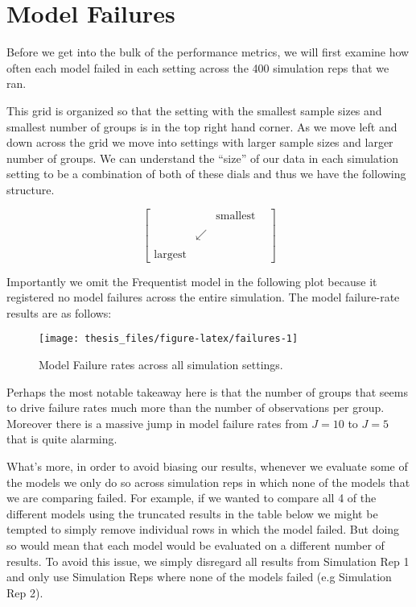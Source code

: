\documentclass[12pt,twoside]{reedthesis}
\begin{document}
\hypertarget{model-failures}{%
\section{Model Failures}\label{model-failures}}

Before we get into the bulk of the performance metrics, we will first examine how often each model failed in each setting across the 400 simulation reps that we ran.

This grid is organized so that the setting with the smallest sample sizes and smallest number of groups is in the top right hand corner. As we move left and down across the grid we move into settings with larger sample sizes and larger number of groups. We can understand the ``size'' of our data in each simulation setting to be a combination of both of these dials and thus we have the following structure.

\[
\begin{bmatrix}
 &  & \text{smallest} \\
 & & & \\
 & \swarrow &  \\
 & & & \\
\text{largest} & & 
\end{bmatrix}
\]

Importantly we omit the Frequentist model in the following plot because it registered no model failures across the entire simulation. The model failure-rate results are as follows:
\begin{figure}

{\centering \texttt{[image: thesis\_files/figure-latex/failures-1]} 

}

\caption{Model Failure rates across all simulation settings.}\label{fig:failures}
\end{figure}
Perhaps the most notable takeaway here is that the number of groups that seems to drive failure rates much more than the number of observations per group. Moreover there is a massive jump in model failure rates from \(J = 10\) to \(J=5\) that is quite alarming.

What's more, in order to avoid biasing our results, whenever we evaluate some of the models we only do so across simulation reps in which none of the models that we are comparing failed. For example, if we wanted to compare all 4 of the different models using the truncated results in the table below we might be tempted to simply remove individual rows in which the model failed. But doing so would mean that each model would be evaluated on a different number of results. To avoid this issue, we simply disregard all results from Simulation Rep 1 and only use Simulation Reps where none of the models failed (e.g Simulation Rep 2).
\end{document}
